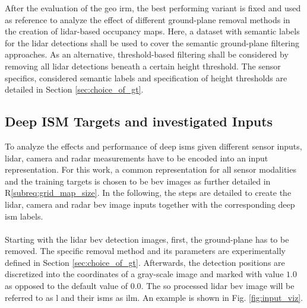 After the evaluation of the geo \gls{irm}, the best performing variant is fixed and used as reference to analyze the effect of different ground-plane removal methods in the creation of lidar-based occupancy maps. Here, a dataset with semantic labels for the lidar detections shall be used to cover the semantic ground-plane filtering approaches. As an alternative, threshold-based filtering shall be considered by removing all lidar detections beneath a certain height threshold. The sensor specifics, considered semantic labels and specification of height thresholds are detailed in Section \ref{sec:choice_of_gt}. 
%
\subsection{Deep ISM Targets and investigated Inputs}
\label{subsec:def_of_targets_n_inputs}
To analyze the effects and performance of deep \gls{ism}s given different sensor inputs, lidar, camera and radar measurements have to be encoded into an input representation. For this work, a common representation for all sensor modalities and the training targets is chosen to be \gls{bev} images as further detailed in R\ref{subreq:grid_map_size}. In the following, the steps are detailed to create the lidar, camera and radar \gls{bev} image inputs together with the corresponding deep \gls{ism} labels. 
\\\\
Starting with the lidar \gls{bev} detection images, first, the ground-plane has to be removed. The specific removal method and its parameters are experimentally defined in Section \ref{sec:choice_of_gt}. Afterwards, the detection positions are discretized into the coordinates of a gray-scale image and marked with value $1.0$ as opposed to the default value of $0.0$. The so processed lidar \gls{bev} image will be referred to as \gls{l} and their \gls{ism}s as \gls{ilm}. An example is shown in Fig. \ref{fig:input_viz}.
\\\\
